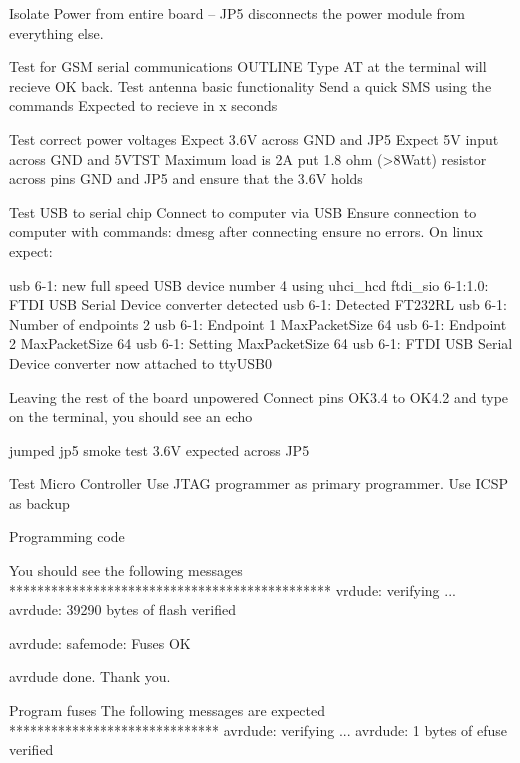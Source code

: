 \documentclass[]{article}
\begin{document}
                 Isolate Power from entire board
                 -- JP5 disconnects the power module from everything else.

            Test for GSM serial communications OUTLINE
                Type AT at the terminal will recieve OK back.
                Test antenna basic functionality
                Send a quick SMS using the commands
                Expected to recieve in x seconds


            Test correct power voltages
                Expect 3.6V across GND and JP5
                Expect 5V input across GND and 5VTST
                Maximum load is 2A put 1.8 ohm (>8Watt) resistor across pins GND and JP5 and ensure that the 3.6V holds

            Test USB to serial chip
            Connect to computer via USB
            Ensure connection to computer with commands:
                dmesg after connecting ensure no errors. On linux expect:
             
                usb 6-1: new full speed USB device number 4 using uhci_hcd
                ftdi_sio 6-1:1.0: FTDI USB Serial Device converter detected
                usb 6-1: Detected FT232RL
                usb 6-1: Number of endpoints 2
                usb 6-1: Endpoint 1 MaxPacketSize 64
                usb 6-1: Endpoint 2 MaxPacketSize 64
                usb 6-1: Setting MaxPacketSize 64
                usb 6-1: FTDI USB Serial Device converter now attached to ttyUSB0

            Leaving the rest of the board unpowered
            Connect pins OK3.4 to OK4.2 and type on the terminal, you should see an echo

            jumped jp5
            smoke test
            3.6V expected across JP5
            

            Test Micro Controller
                Use JTAG programmer as primary programmer. Use ICSP as backup
                
                Programming code
                

                You should see the following messages
                **********************************************
                vrdude: verifying ...
                avrdude: 39290 bytes of flash verified

                avrdude: safemode: Fuses OK

                avrdude done.  Thank you.

                Program fuses
                The following messages are expected 
                ******************************
                avrdude: verifying ...
avrdude: 1 bytes of efuse verified
\end{document}
